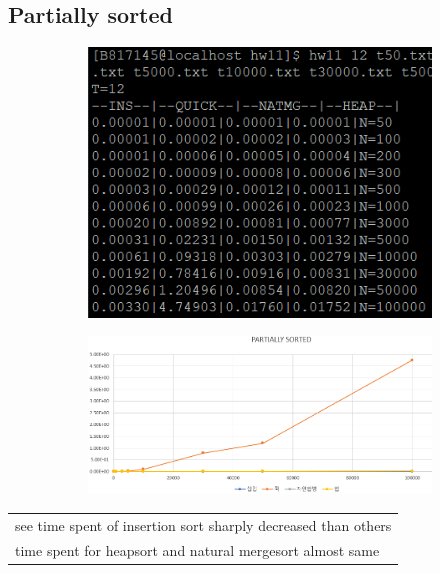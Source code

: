 \documentclass{article}
\begin{document}
\subsection{Partially sorted }
\begin{figure}[H]
\begin{subfigure}[ht]{.3\linewidth}\centering
\includegraphics[width=.9\linewidth]{partially2.PNG}
\end{subfigure}
\begin{subfigure}[ht]{.7\linewidth}\centering
\includegraphics[width=.9\linewidth]{partially.PNG}
\end{subfigure}
\end{figure}
\begin{table}[H]
\centering
\begin{tabular}{|m{15cm}|}
\hline
see time spent of insertion sort sharply decreased than others\\
time spent for heapsort and natural mergesort almost same\\
\hline
\end{tabular}
\end{table}
\end{document}

